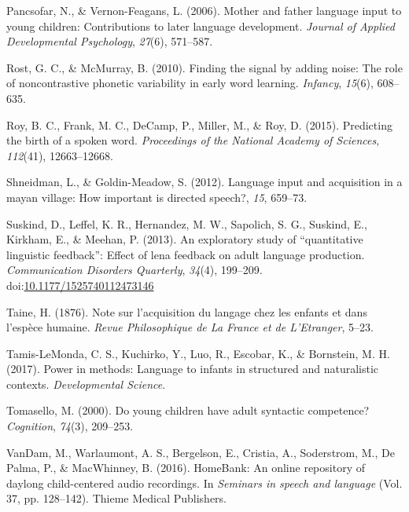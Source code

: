 \documentclass[man]{apa6}
\theoremstyle{definition}
\theoremstyle{definition}
\theoremstyle{definition}
\theoremstyle{remark}
\begin{document}
\leavevmode\hypertarget{ref-pancsofar2006mother}{}%
Pancsofar, N., \& Vernon-Feagans, L. (2006). Mother and father language
input to young children: Contributions to later language development.
\emph{Journal of Applied Developmental Psychology}, \emph{27}(6),
571--587.

\leavevmode\hypertarget{ref-rost2010finding}{}%
Rost, G. C., \& McMurray, B. (2010). Finding the signal by adding noise:
The role of noncontrastive phonetic variability in early word learning.
\emph{Infancy}, \emph{15}(6), 608--635.

\leavevmode\hypertarget{ref-roy2015predicting}{}%
Roy, B. C., Frank, M. C., DeCamp, P., Miller, M., \& Roy, D. (2015).
Predicting the birth of a spoken word. \emph{Proceedings of the National
Academy of Sciences}, \emph{112}(41), 12663--12668.

\leavevmode\hypertarget{ref-shneidman2012language}{}%
Shneidman, L., \& Goldin-Meadow, S. (2012). Language input and
acquisition in a mayan village: How important is directed speech?,
\emph{15}, 659--73.

\leavevmode\hypertarget{ref-suskind2013exploratory}{}%
Suskind, D., Leffel, K. R., Hernandez, M. W., Sapolich, S. G., Suskind,
E., Kirkham, E., \& Meehan, P. (2013). An exploratory study of
``quantitative linguistic feedback'': Effect of lena feedback on adult
language production. \emph{Communication Disorders Quarterly},
\emph{34}(4), 199--209.
doi:\href{https://doi.org/10.1177/1525740112473146}{10.1177/1525740112473146}

\leavevmode\hypertarget{ref-taine1876note}{}%
Taine, H. (1876). Note sur l'acquisition du langage chez les enfants et
dans l'espèce humaine. \emph{Revue Philosophique de La France et de
L'Etranger}, 5--23.

\leavevmode\hypertarget{ref-tamis2017power}{}%
Tamis-LeMonda, C. S., Kuchirko, Y., Luo, R., Escobar, K., \& Bornstein,
M. H. (2017). Power in methods: Language to infants in structured and
naturalistic contexts. \emph{Developmental Science}.

\leavevmode\hypertarget{ref-tomasello2000young}{}%
Tomasello, M. (2000). Do young children have adult syntactic competence?
\emph{Cognition}, \emph{74}(3), 209--253.

\leavevmode\hypertarget{ref-vandam2016homebank}{}%
VanDam, M., Warlaumont, A. S., Bergelson, E., Cristia, A., Soderstrom,
M., De Palma, P., \& MacWhinney, B. (2016). HomeBank: An online
repository of daylong child-centered audio recordings. In \emph{Seminars
in speech and language} (Vol. 37, pp. 128--142). Thieme Medical
Publishers.
\end{document}
